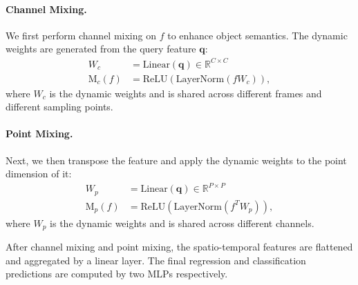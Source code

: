 \documentclass[10pt,twocolumn,letterpaper]{article}
\begin{document}
\paragraph{Channel Mixing.} We first perform channel mixing on $f$ to enhance object semantics. The dynamic weights are generated from the query feature $\mathbf{q}$:
\begin{align}
  W_c &= \text{Linear}(\mathbf{q}) \in \mathbb{R}^{C \times C} \\
  \text{M}_c(f) &= \text{ReLU}(\text{LayerNorm}(f W_c)),
\end{align}
where $W_c$ is the dynamic weights and is shared across different frames and different sampling points.

\paragraph{Point Mixing.} Next, we then transpose the feature and apply the dynamic weights to the point dimension of it:
\begin{align}
  W_p &= \text{Linear}(\mathbf{q}) \in \mathbb{R}^{P \times P} \\
  \text{M}_p(f) &= \text{ReLU}(\text{LayerNorm}(f^T W_p)),
\end{align}
where $W_p$ is the dynamic weights and is shared across different channels.

After channel mixing and point mixing, the spatio-temporal features are flattened and aggregated by a linear layer. The final regression and classification predictions are computed by two MLPs respectively.
\end{document}
